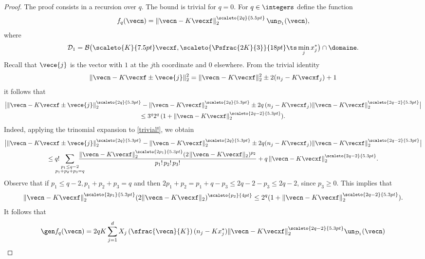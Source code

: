 \begin{proof} The proof consists in a recursion over $q$. The bound is trivial for $q=0$.
For $q\in\integers$ define the function
\[
f_q(\vecn)=\|\vecn-K\vecxf\|_{2}^{\scaleto{2q}{5.5pt}} \,\un_{\mathcal{D}_1}(\vecn),
\]
where
\begin{equation*}
\mathcal{D}_1 = \mathcal{B} \bigl(\scaleto{K}{7.5pt}\vecxf, \scaleto{\Psfrac{2K}{3}}{18pt}\ts\min_{j}x^*_{j}\bigr)\cap \domaine.
\end{equation*}
Recall that $\vece{j}$ is the vector with $1$ at the $j$th coordinate and $0$ elsewhere. From the trivial identity
\begin{equation}
\label{trivial!}
\|\vecn - K\vecxf \pm \vece{j}\|_{2}^2 = \|\vecn - K\vecxf\|_{2}^2 \pm 2(n_j -K\vecxf_{j})+1
\end{equation}
it follows that
\begin{multline*}
\big|\|\vecn - K\vecxf \pm \vece{j}\|_{2}^{\scaleto{2q}{5.3pt}} -
\|\vecn - K\vecxf\|_{2}^{\scaleto{2q}{5.3pt}} \pm 2q\, (n_j -K\vecxf_{j})\|\vecn - K\vecxf\|_{2}^{\scaleto{2q-2}{5.3pt}}\big|\\
\leq 3^q 2^q \,(1+\|\vecn - K\vecxf\|_{2}^{\scaleto{2q-2}{5.3pt}}).
\end{multline*}
Indeed, applying the trinomial expansion to \eqref{trivial!}, we obtain
\begin{multline*}
\big|\|\vecn - K\vecxf \pm \vece{j}\|_{2}^{\scaleto{2q}{5.3pt}} -
\|\vecn - K\vecxf\|_{2}^{\scaleto{2q}{5.3pt}} \pm 2q (n_j -K\vecxf_{j})\|\vecn - K\vecxf\|_{2}^{\scaleto{2q-2}{5.3pt}}\big|\\
\leq
q! \hspace*{-3mm}\sum_{\substack{p_{1}\leq q-2\\ p_{1}+p_{2}+p_{3} = q}}\hspace*{-4mm}
\frac{\|\vecn - K\vecxf\|_{2}^{\scaleto{2p_{1}}{5.3pt}} (2\hspace{1pt} \|\vecn - K\vecxf\|_{2})^{p_{2}} }{p_{1}! \, p_{2}! \, p_{3}!}
+ q\, \|\vecn - K\vecxf\|_{2}^{\scaleto{2q-2}{5.3pt}}.
\end{multline*}
Observe that if $p_{1}\leq q-2, p_{1}+p_{2}+p_{3} = q$ and then
$2p_{1}+p_{2} =p_{1}+q-p_{3}\leq 2q -2 -p_{3}\leq 2q-2$, since $p_{3}\geq 0$. This implies that
\[
\|\vecn - K\vecxf\|_{2}^{\scaleto{2p_{1}}{5.3pt}} (2 \|\vecn - K\vecxf\|_{2})^{\scaleto{p_{2}}{4pt}}
\leq 2^q(1+\|\vecn - K\vecxf\|_{2}^{\scaleto{2q-2}{5.3pt}}).
\]
It follows that
\begin{equation}\label{genfq}
\gen f_q(\vecn)=
2q K \sum_{j=1}^d X_j\left(\sfrac{\vecn}{K}\right) (n_j-Kx_j^*) \|\vecn - K\vecxf\|_{2}^{\scaleto{2q-2}{5.3pt}} \un_{\mathcal{D}_1}(\vecn)

\end{equation}
\end{proof}

